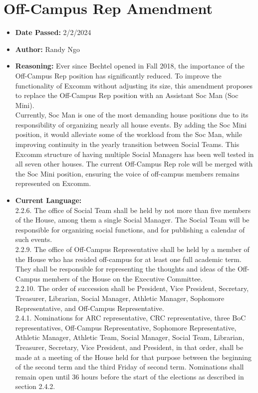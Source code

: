 \documentclass[10pt]{article} %
\begin{document}
\section{Off-Campus Rep Amendment}
\begin{itemize}
	\item \textbf{Date Passed:} 2/2/2024
	\item \textbf{Author:} Randy Ngo
	\item \textbf{Reasoning:} Ever since Bechtel opened in Fall 2018, the importance of the Off-Campus Rep position has significantly reduced. To improve the functionality of Excomm without adjusting its size, this amendment proposes to replace the Off-Campus Rep position with an Assistant Soc Man (Soc Mini). \\
	Currently, Soc Man is one of the most demanding house positions due to its responsibility of organizing nearly all house events. By adding the Soc Mini position, it would alleviate some of the workload from the Soc Man, while improving continuity in the yearly transition between Social Teams. This Excomm structure of having multiple Social Managers has been well tested in all seven other houses. The current Off-Campus Rep role will be merged with the Soc Mini position, ensuring the voice of off-campus members remains represented on Excomm.
	\item \textbf{Current Language:} \\
	2.2.6. The office of Social Team shall be held by not more than five members of the House, among them a single Social Manager. The Social Team will be responsible for organizing social functions, and for publishing a calendar of such events. \\
	2.2.9. The office of Off-Campus Representative shall be held by a member of the House who has resided off-campus for at least one full academic term. They shall be responsible for representing the thoughts and ideas of the Off-Campus members of the House on the Executive Committee. \\
	2.2.10. The order of succession shall be President, Vice President, Secretary, Treasurer, Librarian, Social Manager, Athletic Manager, Sophomore Representative, and Off-Campus Representative. \\
	2.4.1. Nominations for ARC representative, CRC representative, three BoC representatives, Off-Campus Representative, Sophomore Representative, Athletic Manager, Athletic Team, Social Manager, Social Team, Librarian, Treasurer, Secretary, Vice President, and President, in that order, shall be made at a meeting of the House held for that purpose between the beginning of the second term and the third Friday of second term. Nominations shall remain open until 36 hours before the start of the elections as described in section 2.4.2. \\

\end{itemize}
\end{document}
